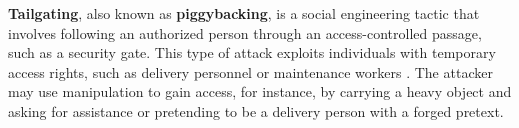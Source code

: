         


















\textbf{Tailgating}, also known as \textbf{piggybacking}, is a social engineering tactic that involves following an authorized person through an access-controlled passage, such as a security gate. This type of attack exploits individuals with temporary access rights, such as delivery personnel or maintenance workers \citep{conteh_cybersecurityrisks_2016}. The attacker may use manipulation to gain access, for instance, by carrying a heavy object and asking for assistance or pretending to be a delivery person with a forged pretext.

